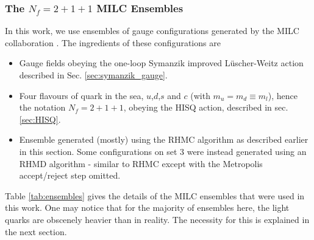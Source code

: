 \subsubsection{The $N_f=2+1+1$ MILC Ensembles}
\label{sec:MILCensembles}

In this work, we use ensembles of gauge configurations generated by the MILC collaboration \cite{Bazavov:2012xda,Bazavov:2010ru}. The ingredients of these configurations are
\begin{itemize}
\item
  Gauge fields obeying the one-loop Symanzik improved L\"uscher-Weitz action described in Sec. \ref{sec:symanzik_gauge}.
\item
  Four flavours of quark in the sea, $u$,$d$,$s$ and $c$ (with $m_u=m_d\equiv m_l$), hence the notation $N_f=2+1+1$, obeying the HISQ action, described in sec. \ref{sec:HISQ}.
\item
  Ensemble generated (mostly) using the RHMC algorithm as described earlier in this section. Some configurations on set 3 were instead generated using an RHMD algorithm - similar to RHMC except with the Metropolis accept/reject step omitted.
\end{itemize}
Table \ref{tab:ensembles} gives the details of the MILC ensembles that were used in this work. One may notice that for the majority of ensembles here, the light quarks are obscenely heavier than in reality. The necessity for this is explained in the next section.

